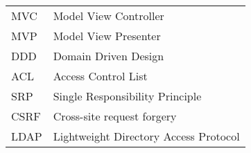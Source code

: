 
\seznamzkr

\begin{tabular}{ll}
MVC & Model View Controller \\
MVP & Model View Presenter \\
DDD & Domain Driven Design \\
ACL & Access Control List \\
SRP & Single Responsibility Principle \\
CSRF & Cross-site request forgery \\
LDAP & Lightweight Directory Access Protocol
\end{tabular}

